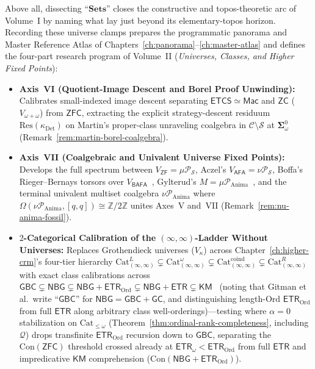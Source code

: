 Above all, dissecting ``$\mathbf{Sets}$'' closes the constructive and topos-theoretic arc of Volume~I by naming what lay just beyond its elementary-topos horizon. Recording these universe clamps prepares the programmatic panorama and Master Reference Atlas of Chapters~\ref{ch:panorama}--\ref{ch:master-atlas} and defines the four-part research program of Volume~II (\emph{Universes, Classes, and Higher Fixed Points}):
\begin{itemize}[leftmargin=1.5em]
  \item \textbf{Axis~VI (Quotient-Image Descent and Borel Proof Unwinding):} Calibrates small-indexed image descent separating $\mathsf{ETCS} \simeq \mathsf{Mac}$ and $\mathsf{ZC}$ ($V_{\omega+\omega}$) from $\mathsf{ZFC}$, extracting the explicit strategy-descent residuum $\mathrm{Res}(\kappa_{\mathrm{Det}})$ on Martin's proper-class unraveling coalgebra in $\mathcal{C} \setminus \mathcal{S}$ at $\boldsymbol{\Sigma}^0_\omega$~\cite{Friedman71,Martin75} (Remark~\ref{rem:martin-borel-coalgebra}).
  \item \textbf{Axis~VII (Coalgebraic and Univalent Universe Fixed Points):} Develops the full spectrum between $V_{\mathsf{ZF}} = \mu \mathcal{P}_{\mathcal{S}}$, Aczel's $V_{\mathsf{AFA}} = \nu \mathcal{P}_{\mathcal{S}}$, Boffa's Rieger--Bernays torsors over $V_{\mathsf{BAFA}}$~\cite{Bernays54,Rieger57,Boffa69}, Gylterud's $M = \mu \mathcal{P}_{\mathrm{Anima}}$~\cite{Gylterud18}, and the terminal univalent multiset coalgebra $\nu \mathcal{P}_{\mathrm{Anima}}$ where $\Omega(\nu \mathcal{P}_{\mathrm{Anima}}, [q, q]) \cong \mathbb{Z}/2\mathbb{Z}$ unites Axes~V and~VII (Remark~\ref{rem:nu-anima-fossil}).
  \item \textbf{$2$-Categorical Calibration of the $(\infty, \infty)$-Ladder Without Universes:} Replaces Grothendieck universes ($V_\kappa$) across Chapter~\ref{ch:higher-crm}'s four-tier hierarchy $\mathrm{Cat}^L_{(\infty,\infty)} \subsetneq \mathrm{Cat}^\omega_{(\infty,\infty)} \subsetneq \mathrm{Cat}^{\mathrm{coind}}_{(\infty,\infty)} \subsetneq \mathrm{Cat}^R_{(\infty,\infty)}$~\cite{ORW26} with exact class calibrations across $\mathsf{GBC} \subsetneq \mathsf{NBG} \subsetneq \mathsf{NBG}+\mathsf{ETR}_{\mathrm{Ord}} \subsetneq \mathsf{NBG}+\mathsf{ETR} \subsetneq \mathsf{KM}$~\cite[Thm.~1.2]{Gitman20} (noting that Gitman et al.\ write ``$\mathsf{GBC}$'' for $\mathsf{NBG} = \mathsf{GBC} + \mathsf{GC}$, and distinguishing length-$\mathrm{Ord}$ $\mathsf{ETR}_{\mathrm{Ord}}$ from full $\mathsf{ETR}$ along arbitrary class well-orderings)---testing where $\alpha = 0$ stabilization on $\mathrm{Cat}_{\le \omega}$ (Theorem~\ref{thm:ordinal-rank-completeness}, including $\mathcal{Q}$) drops transfinite $\mathsf{ETR}_{\mathrm{Ord}}$ recursion down to $\mathsf{GBC}$, separating the $\mathrm{Con}(\mathsf{ZFC})$ threshold crossed already at $\mathsf{ETR}_\omega < \mathsf{ETR}_{\mathrm{Ord}}$ from full $\mathsf{ETR}$ and impredicative $\mathsf{KM}$ comprehension ($\mathrm{Con}(\mathsf{NBG}+\mathsf{ETR}_{\mathrm{Ord}})$).

\end{itemize}
